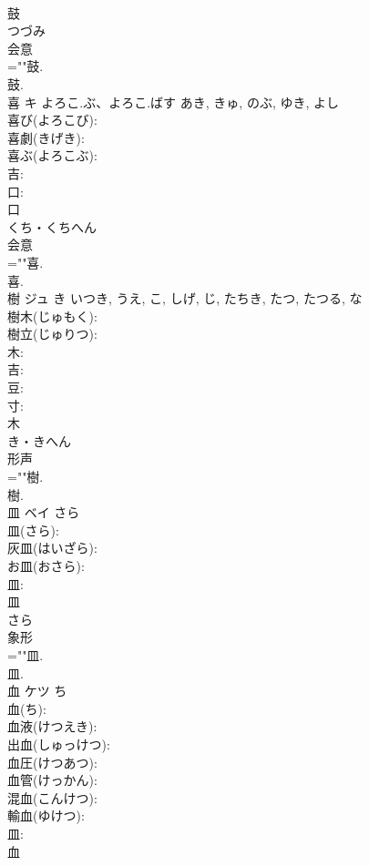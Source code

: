 \documentclass[8pt]{extreport}
\begin{document}
\begin{CJK}{UTF8}{min}
\\	鼓	
\\	つづみ	
\\	会意 
\\	=""鼓.
\\	鼓.
\\	喜	キ	よろこ.ぶ、よろこ.ばす	あき, きゅ, のぶ, ゆき, よし	
\\	喜び(よろこび): 
\\	喜劇(きげき): 
\\	喜ぶ(よろこぶ): 
\\	吉: 
\\	口: 
\\	口	
\\	くち・くちへん	
\\	会意 
\\	=""喜.
\\	喜.
\\	樹	ジュ	き	いつき, うえ, こ, しげ, じ, たちき, たつ, たつる, な	
\\	樹木(じゅもく): 
\\	樹立(じゅりつ): 
\\	木: 
\\	吉: 
\\	豆: 
\\	寸: 
\\	木	
\\	き・きへん	
\\	形声 
\\	=""樹.
\\	樹.
\\	皿	ベイ	さら		
\\	皿(さら): 
\\	灰皿(はいざら): 
\\	お皿(おさら): 
\\	皿: 
\\	皿	
\\	さら	
\\	象形 
\\	=""皿.
\\	皿.
\\	血	ケツ	ち		
\\	血(ち): 
\\	血液(けつえき): 
\\	出血(しゅっけつ): 
\\	血圧(けつあつ): 
\\	血管(けっかん): 
\\	混血(こんけつ): 
\\	輸血(ゆけつ): 
\\	皿: 
\\	血	

\end{CJK}
\end{document}
